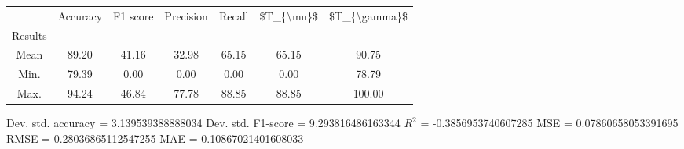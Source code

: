 \begin{tabular}{|c|c|c|c|c|c|c|}
\toprule
{} &  Accuracy &  F1 score &  Precision &  Recall &  \$T\_\{\textbackslash mu\}\$ &  \$T\_\{\textbackslash gamma\}\$ \\
Results &           &           &            &         &            &               \\
\hline
Mean    &     89.20 &     41.16 &      32.98 &   65.15 &      65.15 &         90.75 \\
Min.    &     79.39 &      0.00 &       0.00 &    0.00 &       0.00 &         78.79 \\
Max.    &     94.24 &     46.84 &      77.78 &   88.85 &      88.85 &        100.00 \\
\bottomrule
\end{tabular}

 Dev. std. accuracy = 3.139539388888034
 Dev. std. F1-score = 9.293816486163344
 $R^2$ = -0.3856953740607285
 MSE = 0.07860658053391695
 RMSE = 0.28036865112547255
 MAE = 0.10867021401608033